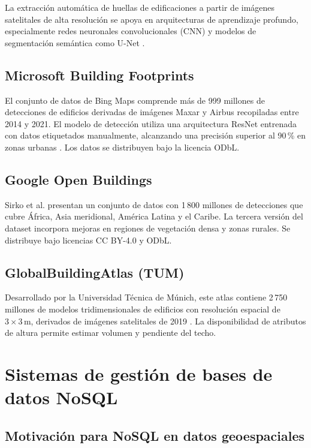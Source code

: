 \documentclass[12pt, a4paper]{report}
\begin{document}
La extracción automática de huellas de edificaciones a partir de imágenes
satelitales de alta resolución se apoya en arquitecturas de aprendizaje
profundo, especialmente redes neuronales convolucionales (CNN) y modelos
de segmentación semántica como U-Net \parencite{ronneberger2015unet}.

\subsection{Microsoft Building Footprints}

El conjunto de datos de Bing Maps comprende más de 999 millones de
detecciones de edificios derivadas de imágenes Maxar y Airbus recopiladas
entre 2014 y 2021. El modelo de detección utiliza una arquitectura ResNet
entrenada con datos etiquetados manualmente, alcanzando una precisión
superior al 90\,\% en zonas urbanas \parencite{microsoft2023buildings}.
Los datos se distribuyen bajo la licencia ODbL.

\subsection{Google Open Buildings}

Sirko et al. \parencite*{sirko2021continental} presentan un conjunto de
datos con 1\,800 millones de detecciones que cubre África, Asia meridional,
América Latina y el Caribe. La tercera versión del dataset incorpora mejoras
en regiones de vegetación densa y zonas rurales. Se distribuye bajo licencias
CC BY-4.0 y ODbL.

\subsection{GlobalBuildingAtlas (TUM)}

Desarrollado por la Universidad Técnica de Múnich, este atlas contiene
2\,750 millones de modelos tridimensionales de edificios con resolución
espacial de $3\times3\,\text{m}$, derivados de imágenes satelitales de 2019
\parencite{geiß2022global}. La disponibilidad de atributos de altura
permite estimar volumen y pendiente del techo.

\section{Sistemas de gestión de bases de datos NoSQL}

\subsection{Motivación para NoSQL en datos geoespaciales}
\end{document}
